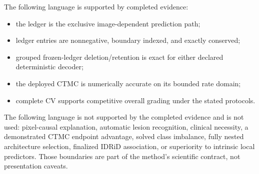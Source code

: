 \documentclass[10pt,twocolumn,letterpaper]{article}
\begin{document}
The following language is supported by completed evidence:
\begin{itemize}[leftmargin=*,itemsep=2pt,topsep=3pt]
  \item the ledger is the exclusive image-dependent prediction path;
  \item ledger entries are nonnegative, boundary indexed, and exactly conserved;
  \item grouped frozen-ledger deletion/retention is exact for either declared
        deterministic decoder;
  \item the deployed CTMC is numerically accurate on its bounded rate domain;
  \item complete CV supports competitive overall grading under the stated
        protocols.
\end{itemize}
The following language is not supported by the completed evidence and is not
used: pixel-causal explanation, automatic lesion recognition, clinical
necessity, a demonstrated CTMC endpoint advantage, solved class imbalance,
fully nested architecture selection, finalized IDRiD association, or
superiority to intrinsic local predictors.  Those boundaries are part of the
method's scientific contract, not presentation caveats.

{\small
  
  
}
\end{document}
